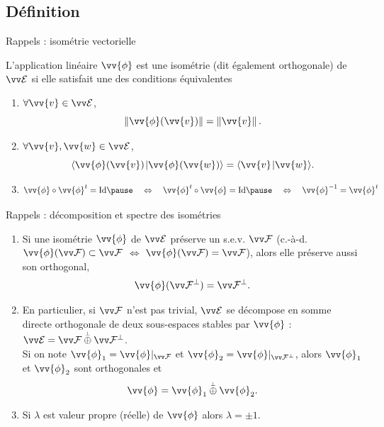\documentclass[bigger]{m53beamer}
\begin{document}
\subsection{Définition}
\begin{frame}{Rappels : isométrie vectorielle }
  \begin{defprop}
    L'application linéaire $\vv{\phi}$ est une \alert{isométrie} (dit également \alert{orthogonale}) de $\ev{E}$ si elle satisfait une des conditions équivalentes
    \begin{enumerate}[<+(1)->]
      \item $\forall \vv{v} \in \ev{E}$,
        \[
           \norm{\vv{\phi}(\vv{v})}=\norm{\vv{v}}.
        \]
      \item $\forall \vv{v},\vv{w} \in \ev{E}$,
        \[
          \scalprod{\vv{\phi}(\vv{v})}{\vv{\phi}(\vv{w})}=\scalprod{\vv{v}}{\vv{w}}.
        \]
      \item
        \[
          \vv{\phi}\circ\vv{\phi}^{t} = \id \pause\quad\Leftrightarrow\quad
          \vv{\phi}^{t}\circ\vv{\phi} = \id \pause\quad\Leftrightarrow\quad
          \vv{\phi}^{-1} = \vv{\phi}^{t}
        \]\forsimple{\vspace*{-.7\baselineskip}}
    \end{enumerate}
  \end{defprop}
\end{frame}

\begin{frame}{Rappels : décomposition et spectre des isométries }
  \begin{enumerate}[<+(1)->]
    \item Si une isométrie $\vv{\phi}$ de $\ev{E}$ préserve un s.e.v. $\ev{F}$ \pause(c.-à-d. $\vv{\phi}(\ev{F})\subset\ev{F}$ $\Leftrightarrow$ $\vv{\phi}(\ev{F})=\ev{F}$)\pause, alors elle préserve aussi son orthogonal\pause,
      \[
        \vv{\phi}(\ev{F}^{\perp})=\ev{F}^{\perp}.
      \]
    \item En particulier, si $\ev{F}$ n'est pas trivial, $\ev{E}$ se décompose en somme directe orthogonale de deux sous-espaces stables par $\vv{\phi}$ : $\ev{E}=\ev{F}\poplus\ev{F}^{\perp}$.\pause\\
    Si on note $\vv{\phi}_{1} = \vv{\phi}|_{\ev{F}}$ et $\vv{\phi}_{2} = \vv{\phi}|_{\ev{F}^{\perp}}$, alors $\vv{\phi}_{1}$ et $\vv{\phi}_{2}$ sont orthogonales et
      \[
        \vv{\phi}=\vv{\phi}_{1}\poplus\vv{\phi}_{2}.
      \]
    \item Si $\lambda$ est valeur propre (réelle) de $\vv{\phi}$ alors $\lambda = \pm 1$.
  \end{enumerate}
\end{frame}
\end{document}
